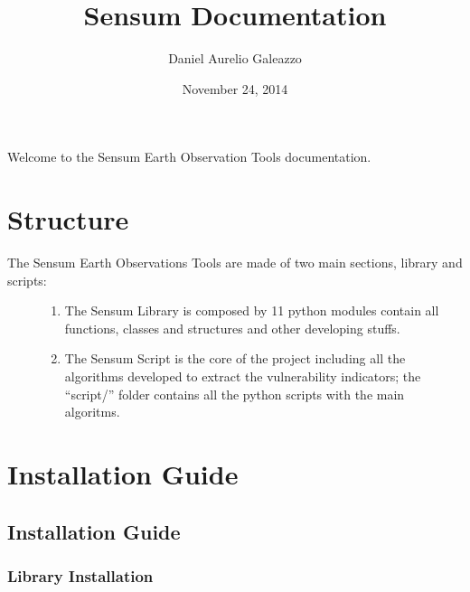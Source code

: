 \documentclass[letterpaper,10pt,english]{sphinxmanual}
\title{Sensum Documentation}
\date{November 24, 2014}
\author{Daniel Aurelio Galeazzo}
\begin{document}
\maketitle
\tableofcontents
{}\label{index::doc}


Welcome to the Sensum Earth Observation Tools documentation.


\chapter{Structure}
\label{index:sensum-earth-observation}\label{index:structure}\begin{description}
\item[{The Sensum Earth Observations Tools are made of two main sections, library and scripts:}] \leavevmode\begin{enumerate}
\item {} 
The Sensum Library is composed by 11 python modules  contain all functions, classes and structures and other developing stuffs.

\item {} 
The Sensum Script is the core of the project including all the algorithms developed to extract the vulnerability indicators; the ``script/'' folder contains all the python scripts with the main algoritms.

\end{enumerate}

\end{description}


\chapter{Installation Guide}
\label{index:installation-guide}

\section{Installation Guide}
\label{install::doc}\label{install:installation-guide}

\subsection{Library Installation}
\label{install:library-installation}
\end{document}
